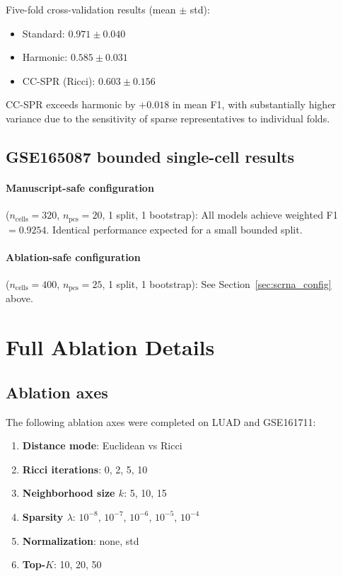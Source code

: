 \documentclass[11pt]{article}
\begin{document}
Five-fold cross-validation results (mean $\pm$ std):
\begin{itemize}[leftmargin=1.5em]
\item Standard: $0.971 \pm 0.040$
\item Harmonic: $0.585 \pm 0.031$
\item CC-SPR (Ricci): $0.603 \pm 0.156$
\end{itemize}

CC-SPR exceeds harmonic by $+0.018$ in mean F1, with substantially higher variance due to the sensitivity of sparse representatives to individual folds.

\subsection{GSE165087 bounded single-cell results}

\paragraph{Manuscript-safe configuration} ($n_{\text{cells}} = 320$, $n_{\text{pcs}} = 20$, 1 split, 1 bootstrap):
All models achieve weighted F1 $= 0.9254$.
Identical performance expected for a small bounded split.

\paragraph{Ablation-safe configuration} ($n_{\text{cells}} = 400$, $n_{\text{pcs}} = 25$, 1 split, 1 bootstrap):
See Section~\ref{sec:scrna_config} above.

\section{Full Ablation Details}
\label{sec:ablation_supp}

\subsection{Ablation axes}
The following ablation axes were completed on LUAD and GSE161711:
\begin{enumerate}[leftmargin=1.5em]
\item \textbf{Distance mode}: Euclidean vs Ricci
\item \textbf{Ricci iterations}: 0, 2, 5, 10
\item \textbf{Neighborhood size $k$}: 5, 10, 15
\item \textbf{Sparsity $\lambda$}: $10^{-8}$, $10^{-7}$, $10^{-6}$, $10^{-5}$, $10^{-4}$
\item \textbf{Normalization}: none, std
\item \textbf{Top-$K$}: 10, 20, 50
\end{enumerate}
\end{document}
